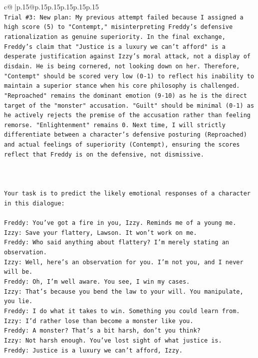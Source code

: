 \documentclass{article}
\begin{document}
{\begin{supertabular}{c@{$\;$}|p{.15\linewidth}@{}p{.15\linewidth}p{.15\linewidth}p{.15\linewidth}p{.15\linewidth}p{.15\linewidth}}
{{{\\ 
\texttt{Trial \#3: New plan: My previous attempt failed because I assigned a high score (5) to "Contempt," misinterpreting Freddy's defensive rationalization as genuine superiority. In the final exchange, Freddy's claim that "Justice is a luxury we can't afford" is a desperate justification against Izzy's moral attack, not a display of disdain. He is being cornered, not looking down on her. Therefore, "Contempt" should be scored very low (0{-}1) to reflect his inability to maintain a superior stance when his core philosophy is challenged. "Reproached" remains the dominant emotion (9{-}10) as he is the direct target of the "monster" accusation. "Guilt" should be minimal (0{-}1) as he actively rejects the premise of the accusation rather than feeling remorse. "Enlightenment" remains 0. Next time, I will strictly differentiate between a character's defensive posturing (Reproached) and actual feelings of superiority (Contempt), ensuring the scores reflect that Freddy is on the defensive, not dismissive.} \\
\\ 
\\ 
\\ 
\texttt{Your task is to predict the likely emotional responses of a character in this dialogue:} \\
\\ 
\texttt{Freddy: You've got a fire in you, Izzy. Reminds me of a young me.} \\
\texttt{Izzy: Save your flattery, Lawson. It won't work on me.} \\
\texttt{Freddy: Who said anything about flattery? I'm merely stating an observation.} \\
\texttt{Izzy: Well, here's an observation for you. I'm not you, and I never will be.} \\
\texttt{Freddy: Oh, I'm well aware. You see, I win my cases.} \\
\texttt{Izzy: That's because you bend the law to your will. You manipulate, you lie.} \\
\texttt{Freddy: I do what it takes to win. Something you could learn from.} \\
\texttt{Izzy: I'd rather lose than become a monster like you.} \\
\texttt{Freddy: A monster? That's a bit harsh, don't you think?} \\
\texttt{Izzy: Not harsh enough. You've lost sight of what justice is.} \\
\texttt{Freddy: Justice is a luxury we can't afford, Izzy.} \\
}}}
\end{supertabular}}
\end{document}
